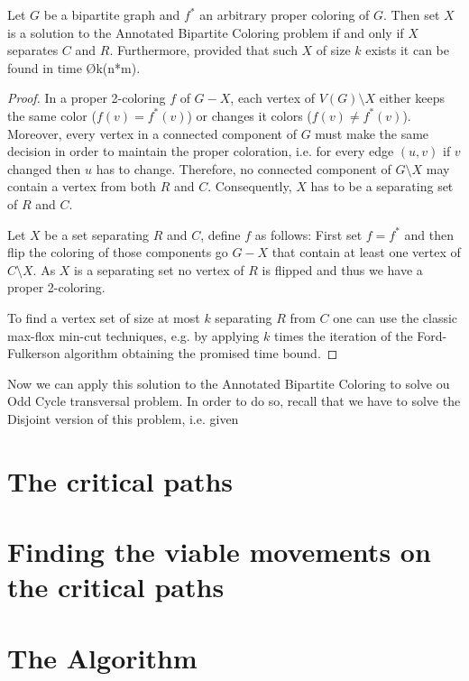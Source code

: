 \begin{lemma}\label{lemma:annotated-bipartite-coloring}
  Let $G$ be a bipartite graph and $f^*$ an arbitrary proper coloring of $G$.
  Then set $X$ is a solution to the Annotated Bipartite Coloring problem if and only if $X$ separates $C$ and $R$.
  Furthermore, provided that such $X$ of size $k$ exists it can be found in time \O{k(n*m)}.
\end{lemma}
\begin{proof}
  In a proper 2-coloring $f$ of $G-X$, each vertex of $V(G) \setminus X$ either keeps the same color ($f(v)=f^*(v)$) or changes it colors ($f(v) \neq f^*(v)$).
  Moreover, every vertex in a connected component of $G$ must make the same decision in order to maintain the proper coloration, i.e. for every edge $(u,v)$ if $v$ changed then $u$ has to change.
  Therefore, no connected component of $G \setminus X$ may contain a vertex from both $R$ and $C$.
  Consequently, $X$ has to be a separating set of $R$ and $C$.

  Let $X$ be a set separating $R$ and $C$, define $f$ as follows: First set $f=f^*$ and then flip the coloring of those components go $G-X$ that contain at least one vertex of $C \setminus X$.
  As $X$ is a separating set no vertex of $R$ is flipped and thus we have a proper 2-coloring.

  To find a  vertex set of size at most $k$ separating $R$ from $C$ one can use the classic max-flox min-cut techniques,
  e.g. by applying $k$ times the iteration of the Ford-Fulkerson algorithm obtaining the promised time bound. %
\end{proof}

Now we can apply this solution to the Annotated Bipartite Coloring to solve ou Odd Cycle transversal problem.
In order to do so, recall that we have to solve the Disjoint version of this problem, i.e. given  


\section{The critical paths}\label{sec:tcp}


\section{Finding the viable movements on the critical paths}\label{sec:path-movements}


\section{The Algorithm}

